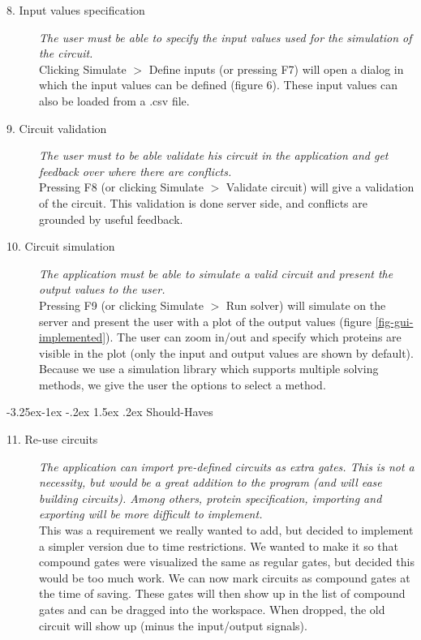 \documentclass[a4paper]{article}
\makeatletter
\renewcommand\paragraph{\@startsection{paragraph}{4}{\z@}%
  {-3.25ex\@plus -1ex \@minus -.2ex}%
  {1.5ex \@plus .2ex}%
  {\normalfont\normalsize\bfseries}}
\makeatother
\begin{document}
\begin{description}
\item[8. Input values specification] \textit{The user must be able to specify the input values used for the simulation of the circuit.}\\
Clicking Simulate $>$ Define inputs (or pressing F7) will open a dialog in which the input values can be defined (figure 6). These input values can also be loaded from a .csv file.

\item[9. Circuit validation] \textit{The user must to be able validate his circuit in the application and get feedback over where there are conflicts.}\\
Pressing F8 (or clicking Simulate $>$ Validate circuit) will give a validation of the circuit. This validation is done server side, and conflicts are grounded by useful feedback.

\item[10. Circuit simulation] \textit{The application must be able to simulate a valid circuit and present the output values to the user.}\\
Pressing F9 (or clicking Simulate $>$ Run solver) will simulate on the server and present the user with a plot of the output values (figure \ref{fig-gui-implemented}). The user can zoom in/out and specify which proteins are visible in the plot (only the input and output values are shown by default). Because we use a simulation library which supports multiple solving methods, we give the user the options to select a method.
\end{description}

\paragraph{Should-Haves}
\begin{description}
\item[11. Re-use circuits] \textit{The application can import pre-defined circuits as extra gates. This is not a necessity, but would be a great addition to the program (and will ease building circuits). Among others, protein specification, importing and exporting will be more difficult to implement.}\\
This was a requirement we really wanted to add, but decided to implement a simpler version due to time restrictions. We wanted to make it so that compound gates were visualized the same as regular gates, but decided this would be too much work. We can now mark circuits as compound gates at the time of saving. These gates will then show up in the list of compound gates and can be dragged into the workspace. When dropped, the old circuit will show up (minus the input/output signals).
\end{description}
\end{document}
